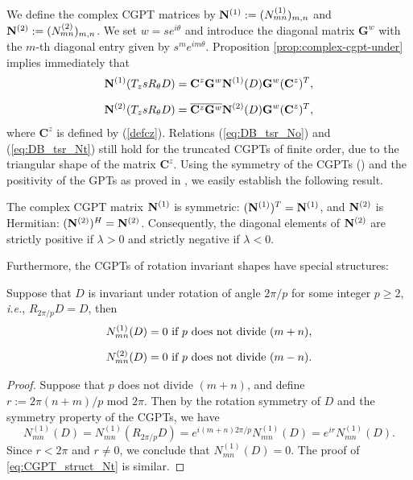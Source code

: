 We define the complex  CGPT matrices by $\mathbf{N}^{(1)}:= (N_{mn}^{(1)})_{m,n}$
and $\mathbf{N}^{(2)}:= (N_{mn}^{(2)})_{m,n}$. We set $w=se^{i\theta}$ and
introduce the diagonal matrix $\mathbf{G}^w$ with the $m$-th
diagonal entry given by $s^me^{im\theta}$. Proposition
\ref{prop:complex-cgpt-under} implies immediately that
\begin{align}
  \No(\tsr D) &= \mathbf{C}^z \mathbf{G}^w\No(D) \mathbf{G}^w(\mathbf{C}^z)^T ,\label{eq:DB_tsr_No}\\
  \nm
  \Nt(\tsr D) &= \overline{\mathbf{C}^z \mathbf{G}^w}\Nt(D) \mathbf{G}^w(\mathbf{C}^z)^T, \label{eq:DB_tsr_Nt}
\end{align}
where $\mathbf{C}^z$ is defined by (\ref{defcz}). Relations
(\ref{eq:DB_tsr_No}) and (\ref{eq:DB_tsr_Nt}) still hold for the
truncated CGPTs of finite order, due to the triangular shape of
the matrix $\mathbf{C}^z$.
Using the symmetry  of the CGPTs (\cite[Theorem
4.11]{ammari2007polarization}) and the positivity of the GPTs as
proved in \cite{ammari2007polarization}, we  easily establish
the following result.
\begin{proposition}
  \label{prop:CGPT_symm_herm}
  The complex CGPT matrix $\mathbf{N}^{(1)}$ is symmetric: $(\mathbf{N}^{(1)})^T = \mathbf{N}^{(1)}$, and $\mathbf{N}^{(2)}$ is
  Hermitian: $(\mathbf{N}^{(2)})^H = \mathbf{N}^{(2)}$. Consequently, the diagonal elements of
  $\mathbf{N}^{(2)}$ are strictly positive if $\lambda >0$ and strictly negative if $\lambda <0$.
\end{proposition}

Furthermore, the CGPTs of rotation invariant shapes have special
structures:
\begin{proposition}
  \label{prop:CGPT_rotsymm_struct}
  Suppose that $D$ is invariant under rotation of angle $2\pi/p$ for
  some integer $p\geq 2$, \emph{i.e.}, $R_{2\pi/p}D = D$, then
  \begin{align}
    N_{mn}^{(1)}(D) = 0 \mbox{ if } p \mbox{ does not divide }  (m+n) \label{eq:CGPT_struct_No},\\
    \nm
    N_{mn}^{(2)}(D) = 0 \mbox{ if } p \mbox{ does not divide } (m-n).
    \label{eq:CGPT_struct_Nt}
  \end{align}
\end{proposition}
\begin{proof}
  Suppose that $p$ does not divide $(m+n)$, and define $r:=2\pi(n+m)/p \mbox{ mod }
  2\pi$. Then by the rotation symmetry of $D$ and the symmetry property
  of the
  CGPTs, we have
  $$
  N_{mn}^{(1)}(D) = N_{mn}^{(1)}(R_{2\pi /p}D) = e^{i(m+n)2\pi/p}N_{mn}^{(1)}(D) =
  e^{ir}N_{mn}^{(1)}(D).
  $$
  Since $r<2\pi$ and $r\neq 0$, we conclude that $N_{mn}^{(1)}(D)=0$. The
  proof of \eqref{eq:CGPT_struct_Nt} is similar.
\end{proof}



